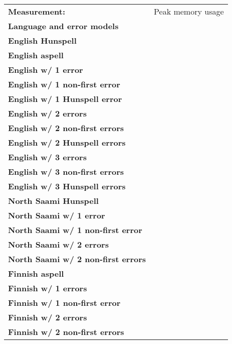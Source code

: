 \documentclass[a4paper,12pt]{article}
\begin{document}
\begin{table}
    \centering
    \begin{tabular}{|l|r|}
        \hline
        \bf Measurement:              & Peak memory usage \\
        \bf Language and error models &        \\
        \hline
        \bf English Hunspell &  \\
          \bf English aspell &  \\
        \hline
        \bf English w/ 1 error     &  \\
 \bf English w/ 1 non-first error  &   \\
 \bf English w/ 1 Hunspell error   &   \\
     \bf English w/ 2 errors       &   \\
 \bf English w/ 2 non-first errors &  \\
 \bf English w/ 2 Hunspell errors  &  \\
   \bf English w/ 3 errors         &   \\
 \bf English w/ 3 non-first errors &   \\
 \bf English w/ 3 Hunspell errors  &   \\
        \hline
   \bf North Saami Hunspell & \\
        \hline
        \bf North Saami w/ 1 error    &  \\
\bf North Saami w/ 1 non-first error  &  \\
       \bf North Saami w/ 2 errors    &  \\
\bf North Saami w/ 2 non-first errors &  \\
        \hline
        \bf Finnish aspell & \\
        \hline
        \bf Finnish w/ 1 errors   &   \\
\bf Finnish w/ 1 non-first error  &   \\
        \bf Finnish w/ 2 errors   &  \\
\bf Finnish w/ 2 non-first errors &  \\

\end{tabular}
\end{table}
\end{document}
